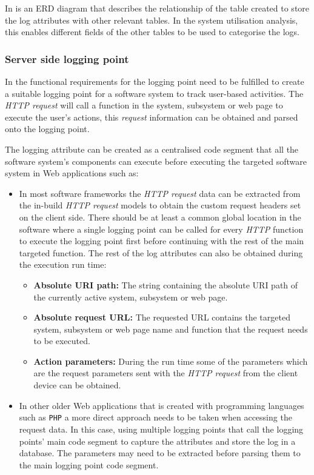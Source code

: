 In  is an ERD diagram that describes the relationship of the table created to store the log attributes with other relevant tables. In the system utilisation analysis, this enables different fields of the other tables to be used to categorise the logs. 

\clearpage

\subsubsection{Server side logging point}\label{sec:ch2_serverSideLoggingpoint}
In  the functional requirements for the logging point need to be fulfilled to create a suitable logging point for a software system to track user-based activities. The \textit{HTTP request} will call a function in the system, subsystem or web page to execute the user's actions, this \textit {request} information can be obtained and parsed onto the logging point.\par The logging attribute can be created as a centralised code segment that all the software system's components can execute before executing the targeted software system in Web applications such as:

\begin{itemize}
	\item In most software frameworks the \textit{HTTP request} data can be extracted from the in-build \textit{HTTP request} models to obtain the custom request headers set on the client side. There should be at least a common global location in the software where a single logging point can be called for every \textit{HTTP} function to execute the logging point first before continuing with the rest of the main targeted function. The rest of the log attributes can also be obtained during the execution run time:
	\begin{itemize}
		\item \textbf{Absolute URI path:} The string containing the absolute URI path of the currently active system, subsystem or web page. 
		\item \textbf{Absolute request URL:} The requested URL contains the targeted system, subsystem or web page name and function that the request needs to be executed. 
		\item \textbf{Action parameters:} During the run time some of the parameters which are the request parameters sent with the \textit{HTTP request} from the client device can be obtained.
	\end{itemize}
	\item In other older Web applications that is created with programming languages such as \texttt{PHP} a more direct approach needs to be taken when accessing the request data. In this case, using multiple logging points that call the logging points' main code segment to capture the attributes and store the log in a database. The parameters may need to be extracted before parsing them to the main logging point code segment.
\end{itemize}

